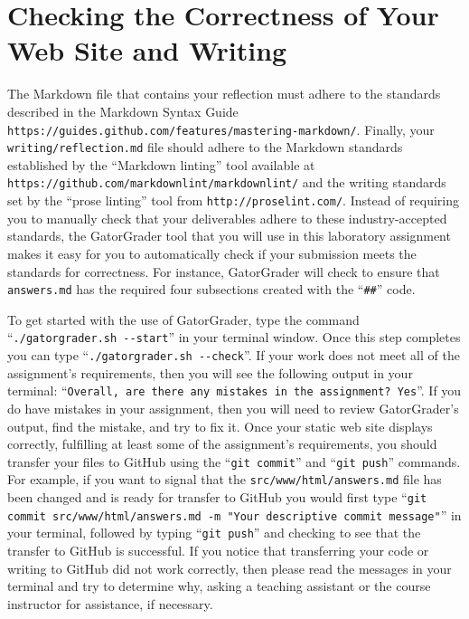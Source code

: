 \documentclass[11pt]{article}
\newcommand{\mainprogram}{\lstinline{answers.md}}
\newcommand{\mainprogramsource}{\lstinline{src/www/html/answers.md}}
\newcommand{\reflection}{\lstinline{writing/reflection.md}}
\newcommand{\gatorgraderstart}{\command{./gatorgrader.sh --start}}
\newcommand{\gatorgradercheck}{\command{./gatorgrader.sh --check}}
\newcommand{\gitcommit}{\command{git commit}}
\newcommand{\gitpush}{\command{git push}}
\newcommand{\gitcommitmainprogram}{\command{git commit src/www/html/answers.md -m "Your
descriptive commit message"}}
\newcommand{\command}[1]{``\lstinline{#1}''}
\newcommand{\url}[1]{\lstinline{#1}}
\newcommand{\step}[1]{``{#1}''}
\begin{document}
\section*{Checking the Correctness of Your Web Site and Writing}

The Markdown file that contains your reflection must adhere to the standards described in the Markdown Syntax Guide
\url{https://guides.github.com/features/mastering-markdown/}. Finally, your \reflection{} file should adhere to the
Markdown standards established by the \step{Markdown linting} tool available at
\url{https://github.com/markdownlint/markdownlint/} and the writing standards set by the \step{prose linting} tool from
\url{http://proselint.com/}. Instead of requiring you to manually check that your deliverables adhere to these
industry-accepted standards, the GatorGrader tool that you will use in this laboratory assignment makes it easy for you
to automatically check if your submission meets the standards for correctness. For instance, GatorGrader will check to
ensure that \mainprogram{} has the required four subsections created with the \command{##} code.

To get started with the use of GatorGrader, type the command \gatorgraderstart{} in your terminal window. Once this step
completes you can type \gatorgradercheck{}. If your work does not meet all of the assignment's requirements, then you
will see the following output in your terminal: \command{Overall, are there any mistakes in the assignment? Yes}. If you
do have mistakes in your assignment, then you will need to review GatorGrader's output, find the mistake, and try to fix
it. Once your static web site displays correctly, fulfilling at least some of the assignment's requirements, you should
transfer your files to GitHub using the \gitcommit{} and \gitpush{} commands. For example, if you want to signal that
the \mainprogramsource{} file has been changed and is ready for transfer to GitHub you would first type
\gitcommitmainprogram{} in your terminal, followed by typing \gitpush{} and checking to see that the transfer to GitHub
is successful. If you notice that transferring your code or writing to GitHub did not work correctly, then please read
the messages in your terminal and try to determine why, asking a teaching assistant or the course instructor for
assistance, if necessary.
\end{document}
